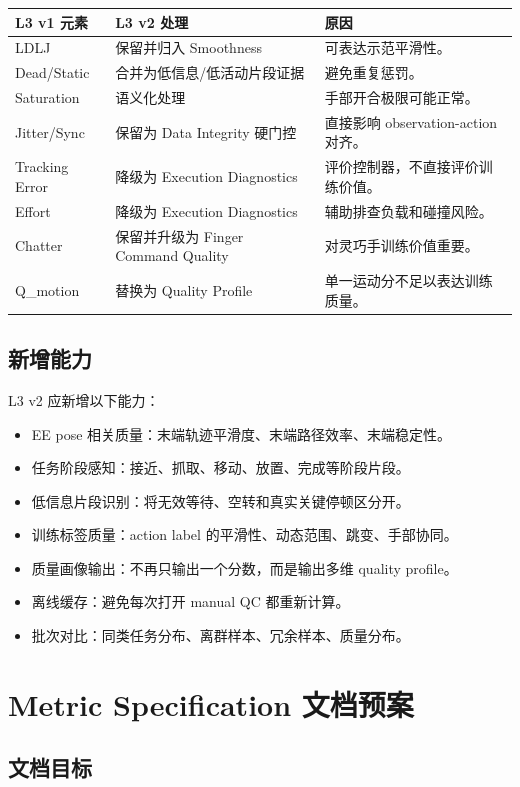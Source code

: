 \documentclass[UTF8,zihao=-4]{ctexart}
\begin{document}
\begin{longtable}{L{3.5cm} L{4.6cm} L{5.5cm}}
\toprule
L3 v1 元素 & L3 v2 处理 & 原因 \\
\midrule
LDLJ & 保留并归入 Smoothness & 可表达示范平滑性。 \\
Dead/Static & 合并为低信息/低活动片段证据 & 避免重复惩罚。 \\
Saturation & 语义化处理 & 手部开合极限可能正常。 \\
Jitter/Sync & 保留为 Data Integrity 硬门控 & 直接影响 observation-action 对齐。 \\
Tracking Error & 降级为 Execution Diagnostics & 评价控制器，不直接评价训练价值。 \\
Effort & 降级为 Execution Diagnostics & 辅助排查负载和碰撞风险。 \\
Chatter & 保留并升级为 Finger Command Quality & 对灵巧手训练价值重要。 \\
Q\_motion & 替换为 Quality Profile & 单一运动分不足以表达训练质量。 \\
\bottomrule
\end{longtable}

\subsection{新增能力}

L3 v2 应新增以下能力：
\begin{itemize}
  \item EE pose 相关质量：末端轨迹平滑度、末端路径效率、末端稳定性。
  \item 任务阶段感知：接近、抓取、移动、放置、完成等阶段片段。
  \item 低信息片段识别：将无效等待、空转和真实关键停顿区分开。
  \item 训练标签质量：action label 的平滑性、动态范围、跳变、手部协同。
  \item 质量画像输出：不再只输出一个分数，而是输出多维 quality profile。
  \item 离线缓存：避免每次打开 manual QC 都重新计算。
  \item 批次对比：同类任务分布、离群样本、冗余样本、质量分布。
\end{itemize}

\section{Metric Specification 文档预案}

\subsection{文档目标}
\end{document}
